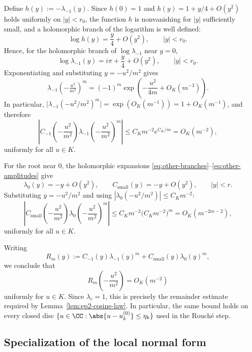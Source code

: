 Define \(h(y):=-\lambda_{-1}(y)\).
Since \(h(0)=1\) and \(h(y)=1+y/4+O(y^2)\) holds uniformly on \(|y|<r_0\), the function \(h\) is nonvanishing for \(|y|\) sufficiently small, and a holomorphic branch of the logarithm is well defined:
\[
\log h(y)=\frac{y}{4}+O(y^2),
\qquad |y|<r_0.
\]
Hence, for the holomorphic branch of \(\log\lambda_{-1}\) near \(y=0\),
\begin{equation}\label{eq:log-lambda-minus-one}
\log \lambda_{-1}(y)=i\pi+\frac{y}{4}+O(y^2),
\qquad |y|<r_0.
\end{equation}
Exponentiating and substituting \(y=-u^2/m^2\) gives
\[
\lambda_{-1}\!\left(-\tfrac{u^2}{m^2}\right)^m
=
(-1)^m\exp\!\left(-\frac{u^2}{4m}+O_K(m^{-3})\right).
\]
In particular, \(\bigl|\lambda_{-1}(-u^2/m^2)^m\bigr|=\exp(O_K(m^{-1}))=1+O_K(m^{-1})\), and therefore
\begin{equation}\label{eq:minus-one-contribution-bound}
\left|
C_{-1}\!\left(-\frac{u^2}{m^2}\right)
\lambda_{-1}\!\left(-\frac{u^2}{m^2}\right)^m
\right|
\le C_K m^{-2}e^{C_K/m}
=
O_K(m^{-2}),
\end{equation}
uniformly for all $u\in K$.

For the root near \(0\), the holomorphic expansions \eqref{eq:other-branches}--\eqref{eq:other-amplitudes} give
\[
\lambda_0(y)=-y+O(y^2),
\qquad
C_{\mathrm{small}}(y)=-y+O(y^2),
\qquad |y|<r.
\]
Substituting \(y=-u^2/m^2\) and using $|\lambda_0(-u^2/m^2)|\le C_K m^{-2}$:
\begin{equation}\label{eq:small-root-contribution-bound}
\left|
C_{\mathrm{small}}\!\left(-\frac{u^2}{m^2}\right)
\lambda_0\!\left(-\frac{u^2}{m^2}\right)^m
\right|
\le
C_K m^{-2}\bigl(C_K m^{-2}\bigr)^m
=
O_K(m^{-2m-2}),
\end{equation}
uniformly for all $u\in K$.

Writing
\[
R_m(y):=
C_{-1}(y)\lambda_{-1}(y)^m+C_{\mathrm{small}}(y)\lambda_0(y)^m,
\]
we conclude that
\begin{equation}\label{eq:appendix-remainder-bound}
R_m\!\left(-\frac{u^2}{m^2}\right)=O_K(m^{-2})
\end{equation}
uniformly for \(u\in K\).
Since \(\lambda_c=1\), this is precisely the remainder estimate required by Lemma~\ref{lem:ep2-cosine-law}.
In particular, the same bound holds on every closed disc \(\{u\in\CC:\abs{u-u_k^{(0)}}\le \eta_k\}\) used in the Rouch\'e step.

\subsection{Specialization of the local normal form}

